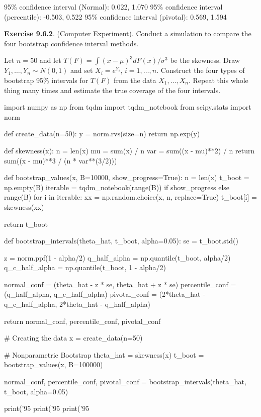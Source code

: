 \begin{console}
95\% confidence interval (Normal):        0.022, 1.070
95\% confidence interval (percentile):    -0.503, 0.522
95\% confidence interval (pivotal):       0.569, 1.594
\end{console}

\textbf{Exercise 9.6.2}. (Computer Experiment). Conduct a simulation to
compare the four bootstrap confidence interval methods.

Let \(n = 50\) and let \(T(F) = \int (x - \mu)^3 dF(x) / \sigma^3\) be
the skewness. Draw \(Y_1, \dots, Y_n \sim N(0, 1)\) and set
\(X_i = e^{Y_i}\), \(i = 1, \dots, n\). Construct the four types of
bootstrap 95\% intervals for \(T(F)\) from the data \(X_1, \dots, X_n\).
Repeat this whole thing many times and estimate the true coverage of the
four intervals.

\begin{python}
import numpy as np
from tqdm import tqdm_notebook
from scipy.stats import norm

def create_data(n=50):
    y = norm.rvs(size=n)
    return np.exp(y)

def skewness(x):
    n = len(x)
    mu = sum(x) / n
    var = sum((x - mu)**2) / n
    return sum((x - mu)**3 / (n * var**(3/2)))

def bootstrap_values(x, B=10000, show_progress=True):
    n = len(x)
    t_boot = np.empty(B)
    iterable = tqdm_notebook(range(B)) if show_progress else range(B)
    for i in iterable:
        xx = np.random.choice(x, n, replace=True)
        t_boot[i] = skewness(xx)

    return t_boot

def bootstrap_intervals(theta_hat, t_boot, alpha=0.05):
    se = t_boot.std()
    
    z = norm.ppf(1 - alpha/2)
    q_half_alpha = np.quantile(t_boot, alpha/2)
    q_c_half_alpha = np.quantile(t_boot, 1 - alpha/2)

    normal_conf = (theta_hat - z * se, theta_hat + z * se)
    percentile_conf = (q_half_alpha, q_c_half_alpha)
    pivotal_conf = (2*theta_hat - q_c_half_alpha, 2*theta_hat - q_half_alpha)
    
    return normal_conf, percentile_conf, pivotal_conf
\end{python}

\begin{python}
# Creating the data
x = create_data(n=50)

# Nonparametric Bootstrap
theta_hat = skewness(x)
t_boot = bootstrap_values(x, B=100000)

normal_conf, percentile_conf, pivotal_conf = bootstrap_intervals(theta_hat, t_boot, alpha=0.05)

print('95%
print('95%
print('95%
\end{python}

